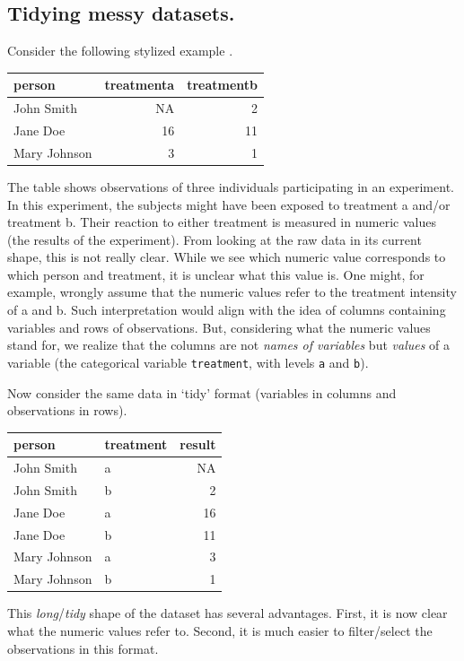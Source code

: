\documentclass[
  12pt,
]{style/krantz}
\begin{document}
\hypertarget{tidying-messy-datasets.}{%
\subsection{Tidying messy datasets.}\label{tidying-messy-datasets.}}

Consider the following stylized example \citep{wickham_2014}.

\begin{tabular}{l|r|r}
\hline
person & treatmenta & treatmentb\\
\hline
John Smith & NA & 2\\
\hline
Jane Doe & 16 & 11\\
\hline
Mary Johnson & 3 & 1\\
\hline
\end{tabular}

The table shows observations of three individuals participating in an experiment. In this experiment, the subjects might have been exposed to treatment a and/or treatment b. Their reaction to either treatment is measured in numeric values (the results of the experiment). From looking at the raw data in its current shape, this is not really clear. While we see which numeric value corresponds to which person and treatment, it is unclear what this value is. One might, for example, wrongly assume that the numeric values refer to the treatment intensity of a and b. Such interpretation would align with the idea of columns containing variables and rows of observations. But, considering what the numeric values stand for, we realize that the columns are not \emph{names of variables} but \emph{values} of a variable (the categorical variable \texttt{treatment}, with levels \texttt{a} and \texttt{b}).

Now consider the same data in `tidy' format (variables in columns and observations in rows).

\begin{tabular}{l|l|r}
\hline
person & treatment & result\\
\hline
John Smith & a & NA\\
\hline
John Smith & b & 2\\
\hline
Jane Doe & a & 16\\
\hline
Jane Doe & b & 11\\
\hline
Mary Johnson & a & 3\\
\hline
Mary Johnson & b & 1\\
\hline
\end{tabular}

This \emph{long}/\emph{tidy} shape of the dataset has several advantages. First, it is now clear what the numeric values refer to. Second, it is much easier to filter/select the observations in this format.
\end{document}
